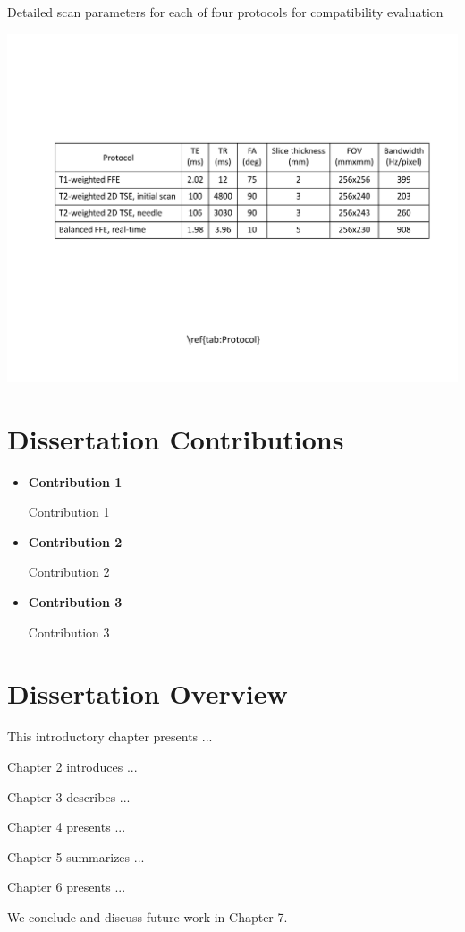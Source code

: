 \begin{table}[htb]
  \begin{center}
\caption[Scan parameters for compatibility evaluation.]{Detailed scan parameters for each of four protocols for compatibility evaluation}
\label{tab:Protocol}
  \end{center}
\includegraphics[width=150mm]{Fig/chap1/Protocol.pdf}
\end{table}
\vspace{-2mm}

\section{Dissertation Contributions}
\label{sec:Contributions}

\begin{itemize}
\item
\textbf{Contribution 1}

Contribution 1

\item
\textbf{Contribution 2}

Contribution 2

\item
\textbf{Contribution 3}

Contribution 3

\end{itemize}


\section{Dissertation Overview}
\label{sec:Overview}

This introductory chapter presents ...

Chapter 2 introduces ...

Chapter 3 describes ...

Chapter 4 presents ...

Chapter 5 summarizes ...

Chapter 6 presents ...

We conclude and discuss future work in Chapter 7. 